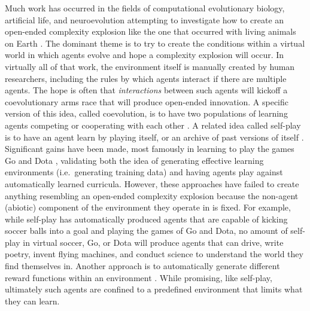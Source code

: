 \documentclass{article}
\begin{document}
Much work has occurred in the fields of computational evolutionary biology, artificial life, and neuroevolution attempting to investigate how to create an open-ended complexity explosion  like the one that occurred with living animals on Earth \cite{lenski2003evolutionary,stanley:open,bedau2000open,langton1997artificial,ray1993evolutionary,brant2017minimal,soros2014identifying,adami2000evolution,taylor2016open,huizinga2018evolving,kouvaris2015evolution,kounios2016resolving,stanley2019designing,clune2011selective,channon2019maximum}. The dominant theme is to try to create the conditions within a virtual world in which agents evolve and hope a complexity explosion will occur. In virtually all of that work, the environment itself is manually created by human researchers, including the rules by which agents interact if there are multiple agents. The hope is often that \emph{interactions} between such agents will kickoff a coevolutionary arms race that will produce open-ended innovation. 
A specific version of this idea, called coevolution, is to have two populations of learning agents competing or cooperating with each other
\cite{de2004incremental,ficici:alife98,jong2004ideal,popovici:hnc12,wiegand:gecco01}. A related idea called self-play is to have an agent learn by playing itself, or an archive of past versions of itself \cite{bansal2017emergent,silver2017mastering,Silver:2016aa}.
Significant gains have been made, most famously in learning to play the games Go and Dota \cite{silver2017mastering,Silver:2016aa}, validating both the idea of generating effective learning environments (i.e.\ generating training data) and having agents play against automatically learned curricula. However, these approaches have failed to create anything resembling an open-ended complexity explosion because the non-agent (abiotic) component of the environment they operate in is fixed. For example, while self-play has automatically produced agents that are capable of kicking soccer balls into a goal and playing the games of Go and Dota, no amount of self-play in virtual soccer, Go, or Dota will produce agents that can drive, write poetry, invent flying machines, and conduct science to understand the world they find themselves in. Another approach is to automatically generate different reward functions within an environment \cite{gupta2018unsupervised}. While promising, like self-play, ultimately such agents are confined to a predefined environment that limits what they can learn. 
\end{document}
